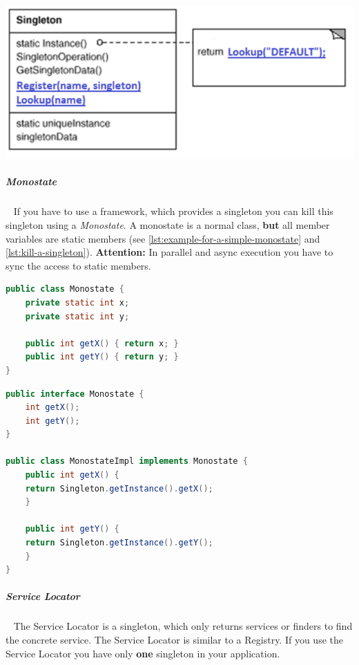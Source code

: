 \documentclass[11pt,twoside,landscape]{article}
\begin{document}
\begin{multicols}{3}
{
\begin{center}
\includegraphics[width=.9\linewidth]{img/registry.png}
\end{center}
\label{fig:registry uml}
}
\subparagraph{Monostate} \
\label{sec:org9651d1a}
If you have to use a framework, which provides a singleton you can kill this singleton using a \emph{Monostate}.
A monostate is a normal class, \textbf{but} all member variables are static members (see \autoref{lst:example-for-a-simple-monostate} and \autoref{lst:kill-a-singleton}).
\textbf{Attention:} In parallel and async execution you have to sync the access to static members.


\begin{lstlisting}[language=java,label=lst:example-for-a-simple-monostate,caption={Example for a simple monostate},captionpos=b,numbers=none]
public class Monostate {
    private static int x;
    private static int y;

    public int getX() { return x; }
    public int getY() { return y; }
}
\end{lstlisting}


\begin{lstlisting}[language=java,label=lst:kill-a-singleton,caption={Kill a singleton},captionpos=b,numbers=none]
public interface Monostate {
    int getX();
    int getY();
}

public class MonostateImpl implements Monostate {
    public int getX() {
	return Singleton.getInstance().getX();
    }

    public int getY() {
	return Singleton.getInstance().getY();
    }
}
\end{lstlisting}
\subparagraph{Service Locator} \
\label{sec:orgccf8c25}
The Service Locator is a singleton, which only returns services or finders to find the concrete service.
The Service Locator is similar to a Registry.
If you use the Service Locator you have only \textbf{one} singleton in your application.


\end{multicols}
\end{document}
